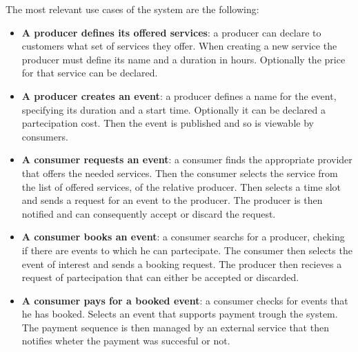 \documentclass{article}
\begin{document}
The most relevant use cases of the system are the following:

\begin{itemize}
	\item \textbf{A producer defines its offered services}: a producer can
		declare to customers what set of services they offer. When creating
		a new service the producer must define its name and a duration in
		hours. Optionally the price for that service can be declared.
	\item \textbf{A producer creates an event}: a producer defines a name
		for the event, specifying its duration and a start time. 
		Optionally it can be declared a partecipation cost. Then the
		event is published and so is viewable by consumers.
	\item \textbf{A consumer requests an event}: a consumer finds the
		appropriate provider that offers the needed services. Then
		the consumer selects the service from the list of offered services,
		of the relative producer. Then selects a time slot and sends a 
		request for an event to the producer. The producer is then notified
		and can consequently accept or discard the request.
	\item \textbf{A consumer books an event}: a consumer searchs for a producer,
		cheking if there are events to which he can partecipate.
		The consumer then selects the event of interest and sends a
		booking request. The producer then recieves a request of
		partecipation that can either be accepted or discarded.
	\item \textbf{A consumer pays for a booked event}: a consumer checks for events
		that he has booked. Selects an event that supports payment
		trough the system. The payment sequence is then managed by an
		external service that then notifies wheter the payment was
		succesful or not.
\end{itemize}
\end{document}
